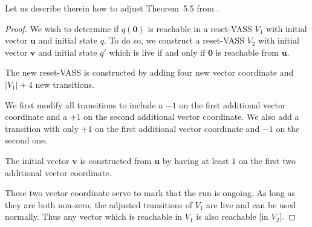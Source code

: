 



Let us describe therein how to adjust Theorem~5.5 from \cite{peterson1981petri}.

\begin{proof}


We wish to determine if $q(\textbf{0})$ is reachable in a reset-VASS $V_1$
with
initial vector $\textbf{u}$ and initial state $q$.
To do so, we construct a reset-VASS $V_2$
with initial vector $\textbf{v}$ and initial state $q'$
which is live if and only if 
$\textbf{0}$
is reachable from $\textbf{u}$.

The new reset-VASS is constructed by adding four new vector coordinate
and
$|V_1|+4$ new transitions.

We first modify all transitions to include a $-1$ on the first additional vector coordinate and a $+1$ on the second additional vector coordinate. We also add a transition with only $+1$ on the first additional vector coordinate and $-1$ on the second one.



The initial vector $\textbf{v}$ is constructed from $\textbf{u}$ by having at least $1$ on the first two additional vector coordinate.



These two vector coordinate serve to mark that the run is ongoing. As long as they are both non-zero, the adjusted transitions of $V_1$ are live and can be used normally. Thus any vector which is reachable in $V_1$ is also reachable [in $V_2$].


\end{proof}
